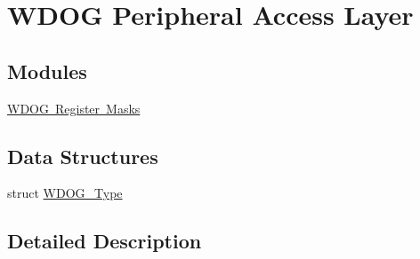 \hypertarget{group___w_d_o_g___peripheral___access___layer}{}\section{W\+D\+OG Peripheral Access Layer}
\label{group___w_d_o_g___peripheral___access___layer}
\subsection*{Modules}
\begin{DoxyCompactItemize}
\item 
\mbox{\hyperlink{group___w_d_o_g___register___masks}{W\+D\+O\+G Register Masks}}
\end{DoxyCompactItemize}
\subsection*{Data Structures}
\begin{DoxyCompactItemize}
\item 
struct \mbox{\hyperlink{struct_w_d_o_g___type}{W\+D\+O\+G\+\_\+\+Type}}
\end{DoxyCompactItemize}


\subsection{Detailed Description}
